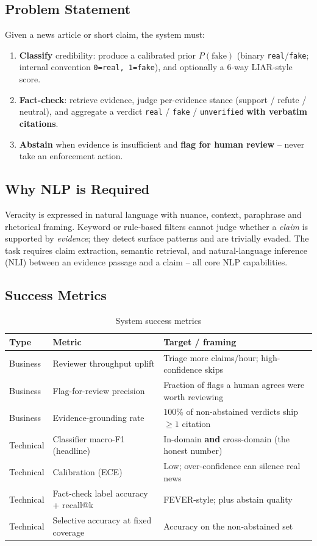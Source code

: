 \documentclass[12pt,a4paper]{article}
\begin{document}
\subsection{Problem Statement}

Given a news article or short claim, the system must:
\begin{enumerate}
  \item \textbf{Classify} credibility: produce a calibrated prior $P(\text{fake})$ (binary \texttt{real}/\texttt{fake}; internal convention \texttt{0=real, 1=fake}), and optionally a 6-way LIAR-style score.
  \item \textbf{Fact-check}: retrieve evidence, judge per-evidence stance (support / refute / neutral), and aggregate a verdict \texttt{real} / \texttt{fake} / \texttt{unverified} \textbf{with verbatim citations}.
  \item \textbf{Abstain} when evidence is insufficient and \textbf{flag for human review} -- never take an enforcement action.
\end{enumerate}

\subsection{Why NLP is Required}

Veracity is expressed in natural language with nuance, context, paraphrase and rhetorical framing. Keyword or rule-based filters cannot judge whether a \emph{claim} is supported by \emph{evidence}; they detect surface patterns and are trivially evaded. The task requires claim extraction, semantic retrieval, and natural-language inference (NLI) between an evidence passage and a claim -- all core NLP capabilities.

\subsection{Success Metrics}

\begin{table}[H]
\centering
\caption{System success metrics}
\begin{tabular}{lll}
\toprule
\textbf{Type} & \textbf{Metric} & \textbf{Target / framing} \\
\midrule
Business & Reviewer throughput uplift & Triage more claims/hour; high-confidence skips \\
Business & Flag-for-review precision & Fraction of flags a human agrees were worth reviewing \\
Business & Evidence-grounding rate & $100\%$ of non-abstained verdicts ship $\geq 1$ citation \\
Technical & Classifier macro-F1 (headline) & In-domain \textbf{and} cross-domain (the honest number) \\
Technical & Calibration (ECE) & Low; over-confidence can silence real news \\
Technical & Fact-check label accuracy + recall@k & FEVER-style; plus abstain quality \\
Technical & Selective accuracy at fixed coverage & Accuracy on the non-abstained set \\
\bottomrule
\end{tabular}
\end{table}
\end{document}
